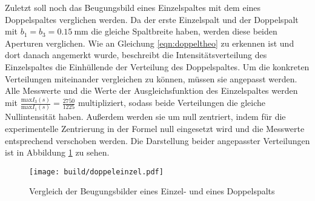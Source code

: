 Zuletzt soll noch das Beugungsbild eines Einzelspaltes mit dem eines Doppelspaltes
verglichen werden. Da der erste Einzelspalt und der Doppelspalt mit $b_1 = b_3 = \SI{0.15}{\milli\meter}$
die gleiche Spaltbreite haben, werden diese beiden Aperturen verglichen.
Wie an Gleichung \eqref{eqn:doppeltheo} zu erkennen ist und dort danach angemerkt
wurde, beschreibt die Intensitätsverteilung des Einzelspaltes die Einhüllende
der Verteilung des Doppelspaltes. Um die konkreten Verteilungen miteinander vergleichen
zu können, müssen sie angepasst werden. Alle Messwerte und die Werte der Ausgleichsfunktion
des Einzelspaltes werden mit $\frac{\text{max} I_3(s)}{\text{max} I_1(s)} = \frac{2750}{1225}$
multipliziert, sodass beide Verteilungen die gleiche Nullintensität haben. Außerdem
werden sie um null zentriert, indem für die experimentelle Zentrierung in der Formel
null eingesetzt wird und die Messwerte entsprechend verschoben werden.
Die Darstellung beider angepasster Verteilungen ist in Abbildung \ref{fig:doppeleinzel}
zu sehen.

\begin{figure}
  \centering
  \texttt{[image: build/doppeleinzel.pdf]}
  \caption{Vergleich der Beugungsbilder eines Einzel- und eines Doppelspalts}
  \label{fig:doppeleinzel}
\end{figure}
